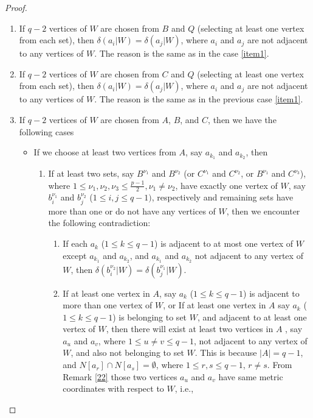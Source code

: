 \documentclass[]{interact}
\theoremstyle{plain}%
\theoremstyle{definition}
\theoremstyle{remark}
\begin{document}
\begin{proof}
\begin{enumerate}
\begin{itemize}
\begin{enumerate}
        \end{enumerate}
     \item If all the sets $B^{\nu_1}$ and $C^{\nu_2}$ (where $1\leq \nu_1,\nu_2 \leq \frac{p-1}{2})$ either contain more than one vertex of  $W$ or do not contain any vertex of $W$, then there exist at least two sets do not contain any vertex of $W$, which we will denote by $B^{\nu_3}$ and $B^{\nu_4}$. This is because $W$ has $q-2$ vertices, and $q-2<2p-4$. Therefore, From Remark \ref{last} $\delta(q_i|W) = \delta(q_j|W)$, where $q_i$ and $q_j$ are adjacent to vertices of $B^{\nu_3}$ and $B^{\nu_4}$ respectively.  
   \end{itemize}
\item If $q-2$ vertices of $W$ are chosen from $B$ and $Q$ (selecting at least one vertex from each set), then $\delta(a_i|W) = \delta(a_j|W)$, where $a_i$ and $a_j$ are not adjacent to any vertices of $W$. The reason is the same as in the case \ref{item1}.
 \item If $q-2$ vertices of $W$ are chosen from $C$ and $Q$ (selecting at least one vertex from each set), then $\delta(a_i|W) = \delta(a_j|W)$, where $a_i$ and $a_j$ are not adjacent to any vertices of $W$. The reason is the same as in the previous case \ref{item1}.
 \item If $q-2$ vertices of $W$ are chosen from $A$, $B$, and $C$, then we have the following cases
 \begin{itemize}
     \item  If we choose at least two vertices from $A$, say $a_{k_1}$ and $a_{k_2}$, then
     \begin{enumerate}
         \item If at least two sets, say $B^{\nu_1}$ and $B^{\nu_2}$ (or $C^{\nu_1}$ and $C^{\nu_2}$, or $B^{\nu_1}$ and $C^{\nu_3}$), where $1\leq \nu_1, \nu_2, \nu_3 \leq \frac{p-1}{2}, \nu_1\neq \nu_2$, have exactly one vertex of $W$, say $b^{\nu_1}_i$ and $b^{\nu_2}_j$ ($1\leq i,j \leq q-1)$, respectively and remaining sets have more than one or do not have any vertices of $W$, then we encounter the following contradiction: 
         \begin{enumerate}
        \item If each $a_k$ ($1\leq k \leq q-1$) is adjacent to at most one vertex of $W$ except $a_{k_1}$ and $a_{k_2}$, and $a_{k_1}$ and $a_{k_2}$ not adjacent to any vertex of $W$, then $\delta( b^{\nu_2}_i|W) =\delta( b^{\nu_1}_{j}|W)$.
       \item If at least one vertex in $A$, say $a_k$ ($1\leq k \leq q-1$) is adjacent to more than one vertex of $W$, or If at least one vertex in $A$ say $a_k$ ($1\leq k \leq q-1$) is belonging to set $W$, and adjacent to at least one vertex of $W$, then there will exist at least two vertices in $A$ , say $a_u $ and $a_v $, where $1\leq u \neq v \leq q-1$, not adjacent to any vertex of $W$, and also not belonging to set $W$. This is because $|A|=q-1$, and $N[a_r]\cap N[a_s]=\emptyset$, where $1\leq r,s\leq q-1$, $r\neq s$. From Remark \ref{22} those two vertices $a_u $ and $a_v $ have same metric coordinates with respect to $W$, i.e.,      

\end{enumerate}
\end{enumerate}
\end{itemize}
\end{enumerate}
\end{proof}
\end{document}
